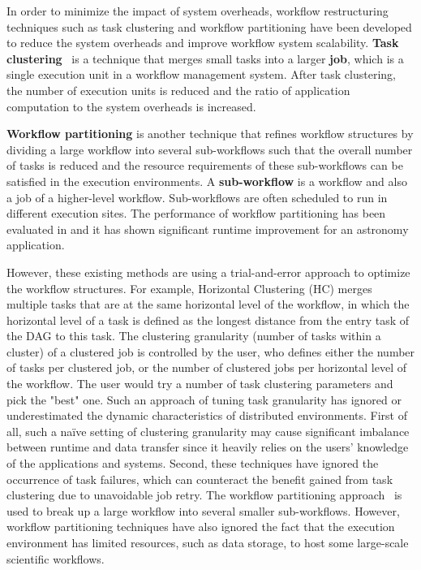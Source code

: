 In order to minimize the impact of system overheads, workflow restructuring techniques such as task clustering \cite{Singh2008,Hussin2010,Zhao2009} and workflow partitioning \cite{Kumar2002, Hedayat2009} have been developed to reduce the system overheads and improve workflow system scalability. \textbf{Task clustering}~\cite{Singh2008} is a technique that merges small tasks into a larger \textbf{job}, which is a single execution unit in a workflow management system. After task clustering, the number of execution units is reduced and the ratio of application computation to the system overheads is increased. 


\textbf{Workflow partitioning} is another technique that refines workflow structures by dividing a large workflow into several sub-workflows such that the overall number of tasks is reduced and the resource requirements of these sub-workflows can be satisfied in the execution environments. A \textbf{sub-workflow} is a workflow and also a job of a higher-level workflow. Sub-workflows are often scheduled to run in different execution sites. The performance of workflow partitioning has been evaluated in \cite{Rynge2012} and it has shown significant runtime improvement for an astronomy application. 
 
However, these existing methods are using a trial-and-error approach to optimize the workflow structures. For example, Horizontal Clustering (HC) \cite{Singh2008} merges multiple tasks that are at the same horizontal level of the workflow, in which the horizontal level of a task is defined as the longest distance from the entry task of the DAG to this task. The clustering granularity (number of tasks within a cluster) of a clustered job is controlled by the user, who defines either the number of tasks per clustered job, or the number of clustered jobs per horizontal level of the workflow. The user would try a number of task clustering parameters and pick the "best" one. Such an approach of tuning task granularity has ignored or underestimated the dynamic characteristics of distributed environments. First of all, such a na\"{i}ve setting of clustering granularity may cause significant imbalance between runtime and data transfer since it heavily relies on the users' knowledge of the applications and systems. Second, these techniques have ignored the occurrence of task failures, which can counteract the benefit gained from task clustering due to unavoidable job retry. The workflow partitioning approach~\cite{Rynge2012} is used to break up a large workflow into several smaller sub-workflows. However, workflow partitioning techniques have also ignored the fact that the execution environment has limited resources, such as data storage, to host some large-scale scientific workflows. 

